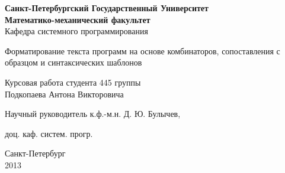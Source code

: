\begin{titlepage}
\newpage

\begin{center}
	\textbf{
		Санкт-Петербургский Государственный Университет \\
		Математико-механический факультет \\
	}
	Кафедра системного программирования
\end{center}

\vspace{15em}

\begin{center}
\Large Форматирование текста программ на основе комбинаторов, сопоставления с образцом и синтаксических шаблонов \\ 
\end{center}

\vspace{2em}

\begin{center}
Курсовая работа студента 445 группы \\
Подкопаева Антона Викторовича

\end{center}

\vspace{10em}

Научный руководитель\dotfill
к.ф.-м.н. Д. Ю. Булычев,

\hfill доц. каф. систем. прогр.



\vspace{\fill}

\begin{center}
Санкт-Петербург \\2013
\end{center}

\end{titlepage}